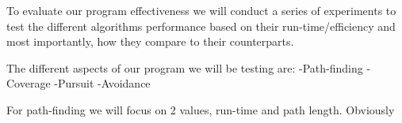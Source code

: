 To evaluate our program effectiveness we will conduct a series of experiments to test the different algorithms performance based on their run-time/efficiency and most importantly, how they compare to their counterparts.

The different aspects of our program we will be testing are:
-Path-finding
-Coverage
-Pursuit
-Avoidance

For path-finding we will focus on 2 values, run-time and path length. Obviously 